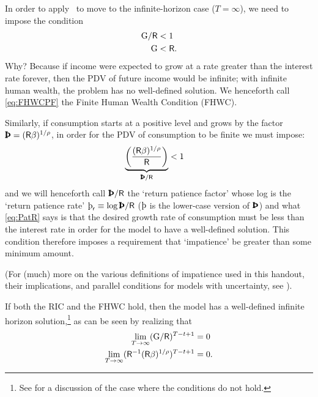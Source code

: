 \documentclass{scrartcl}
\begin{document}
In order to apply \InfSum~to move to the infinite-horizon case ($T=\infty$), we need to impose the condition
\begin{equation}\begin{gathered}\begin{aligned}
        {\ensuremath{\mathrm{G}}}/\mathsf{R} & <  1
\\  {\mathrm{G}}   & <  \mathsf{R}.  \label{eq:FHWCPF}
\end{aligned}\end{gathered}\end{equation}
Why?
Because if income were expected to grow at a rate
greater than the interest rate forever, then the PDV of future income
would be infinite; with infinite human wealth, the problem has no
well-defined solution.
We henceforth call \eqref{eq:FHWCPF} the
Finite Human Wealth Condition (FHWC).

Similarly, if consumption starts at a positive level and grows by the factor $\APFac=(\Rfree \DiscFac)^{1/\CRRA}$, in order for the PDV of consumption to be finite we must impose:
\begin{equation}\begin{gathered}\begin{aligned}
        \underbrace{\left(\frac{(\Rfree\DiscFac)^{1/\CRRA}}{\Rfree}\right)}_{\RPFac} & < 1  \label{eq:PatR}
\end{aligned}\end{gathered}\end{equation}
and we will henceforth call $\RPFac$ the `return patience factor'
whose log is the `return patience rate' $\RPRte \equiv \log \RPFac$ ($\APRte$ is the lower-case version of $\APFac$) and
what \eqref{eq:PatR} says is that the desired growth rate of
consumption must be less than the interest rate in order for the model
to have a well-defined solution.
This condition therefore
imposes a requirement that `impatience' be greater than some minimum amount.

(For (much) more on the various definitions of impatience used in this handout, their implications, and parallel conditions for models with uncertainty, see \cite{BufferStockTheory}).

If both the RIC and the FHWC hold, then the model has a well-defined 
infinite horizon solution,\footnote{See \cite{BufferStockTheory} for a discussion of the case where the conditions do not hold.} as can be seen by realizing that 
\begin{equation}\begin{gathered}\begin{aligned}
   \lim_{T \rightarrow \infty} ({\mathrm{G}}/\mathsf{R})^{T-t+1} & =  0
\\ \lim_{T \rightarrow \infty} (\mathsf{R}^{-1}(\mathsf{R}\beta)^{1/\rho})^{T-t+1} & = 0
.
\end{aligned}\end{gathered}\end{equation}
\end{document}
